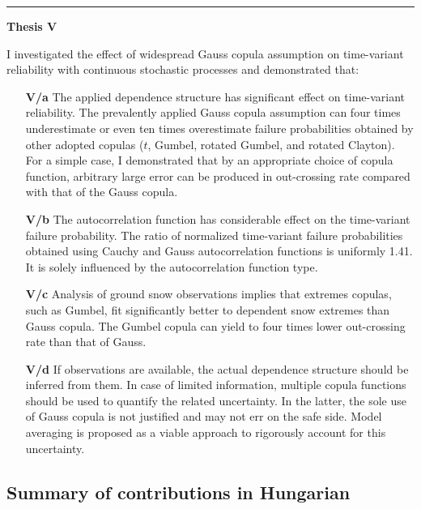 \begin{enumerate}[leftmargin=*, align=left]
  \citep{RozsasEM2015, RozsasIdojaras2016, RozsasAMM2016, SykoraIALCCE2016}
  
  \begin{center}
    \noindent\rule[0.5ex]{0.5\linewidth}{0.5pt}
    \item[\textbf{Thesis V}] \hfill
  \end{center}
    I investigated the effect of widespread Gauss copula assumption on time-variant reliability with continuous stochastic processes and demonstrated that:
    \begin{enumerate}[leftmargin=*, align=left]
      \item[\textbf{V/a}] The applied dependence structure has significant effect on time-variant reliability. The prevalently applied Gauss copula assumption can four times underestimate or even ten times overestimate failure probabilities obtained by other adopted copulas ($t$, Gumbel, rotated Gumbel, and rotated Clayton). For a simple case, I demonstrated that by an appropriate choice of copula function, arbitrary large error can be produced in out-crossing rate compared with that of the Gauss copula.
      
      \item[\textbf{V/b}] The autocorrelation function has considerable effect on the time-variant failure probability. The ratio of normalized time-variant failure probabilities obtained using Cauchy and Gauss autocorrelation functions is uniformly 1.41. It is solely influenced by the autocorrelation function type.
      
      \item[\textbf{V/c}] Analysis of ground snow observations implies that extremes copulas, such as Gumbel, fit significantly better to dependent snow extremes than Gauss copula. The Gumbel copula can yield to four times lower out-crossing rate than that of Gauss.
      
      \item[\textbf{V/d}] If observations are available, the actual dependence structure should be inferred from them. In case of limited information, multiple copula functions should be used to quantify the related uncertainty. In the latter, the sole use of Gauss copula is not justified and may not err on the safe side. Model averaging is proposed as a viable approach to rigorously account for this uncertainty.
    \end{enumerate}
  
    \citep{RozsasSR2016}
  
\end{enumerate}


\subsection*{Summary of contributions in Hungarian}

